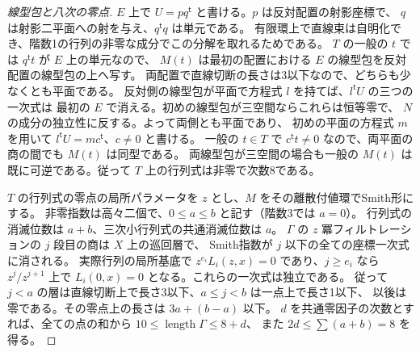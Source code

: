 \begin{proof}[線型包と八次の零点]
$E$ 上で $U=pq^{\mathsf t}$ と書ける。$p$ は反対配置の射影座標で、
$q$ は射影二平面への射を与え、$q^{\mathsf t}q$ は単元である。
有限環上で直線束は自明化でき、階数1の行列の非零な成分でこの分解を取れるためである。
$T$ の一般の $t$ では $q^{\mathsf t}t$ が $E$ 上の単元なので、
$M(t)$ は最初の配置における $E$ の線型包を反対配置の線型包の上へ写す。
両配置で直線切断の長さは3以下なので、どちらも少なくとも平面である。
反対側の線型包が平面で方程式 $l$ を持てば、$l^{\mathsf t}U$ の三つの一次式は
最初の $E$ で消える。初めの線型包が三空間ならこれらは恒等零で、
$N$ の成分の独立性に反する。よって両側とも平面であり、
初めの平面の方程式 $m$ を用いて $l^{\mathsf t}U=m c^{\mathsf t}$、$c\ne0$ と書ける。
一般の $t\in T$ で $c^{\mathsf t}t\ne0$ なので、両平面の商の間でも $M(t)$ は同型である。
両線型包が三空間の場合も一般の $M(t)$ は既に可逆である。従って $T$ 上の行列式は非零で次数8である。

$T$ の行列式の零点の局所パラメータを $z$ とし、$M$ をその離散付値環でSmith形にする。
非零指数は高々二個で、$0\le a\le b$ と記す（階数3では $a=0$）。
行列式の消滅位数は $a+b$、三次小行列式の共通消滅位数は $a$。
$\Gamma$ の $z$ 冪フィルトレーションの $j$ 段目の商は $X$ 上の巡回層で、
Smith指数が $j$ 以下の全ての座標一次式に消される。
実際行列の局所基底で $z^{e_i}L_i(z,x)=0$ であり、$j\ge e_i$ なら
$z^j/z^{j+1}$ 上で $L_i(0,x)=0$ となる。これらの一次式は独立である。
従って $j<a$ の層は直線切断上で長さ3以下、$a\le j<b$ は一点上で長さ1以下、
以後は零である。その零点上の長さは $3a+(b-a)$ 以下。
$d$ を共通零因子の次数とすれば、全ての点の和から
$10\le\operatorname{length}\Gamma\le8+d$、
また $2d\le\sum(a+b)=8$ を得る。
\end{proof}
